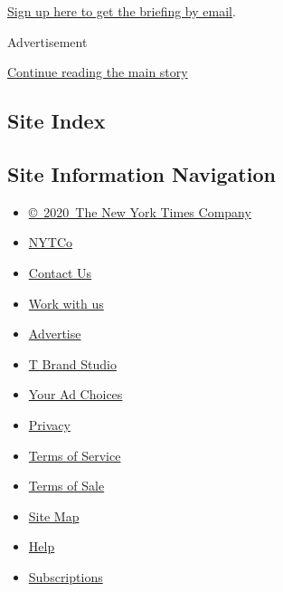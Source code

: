 \href{https://www.nytimes.com/newsletters/coronavirus-briefing}{Sign up
here to get the briefing by email}.

Advertisement

\protect\hyperlink{after-bottom}{Continue reading the main story}

\hypertarget{site-index}{%
\subsection{Site Index}\label{site-index}}

\hypertarget{site-information-navigation}{%
\subsection{Site Information
Navigation}\label{site-information-navigation}}

\begin{itemize}
\tightlist
\item
  \href{https://help.nytimes.com/hc/en-us/articles/115014792127-Copyright-notice}{©~2020~The
  New York Times Company}
\end{itemize}

\begin{itemize}
\tightlist
\item
  \href{https://www.nytco.com/}{NYTCo}
\item
  \href{https://help.nytimes.com/hc/en-us/articles/115015385887-Contact-Us}{Contact
  Us}
\item
  \href{https://www.nytco.com/careers/}{Work with us}
\item
  \href{https://nytmediakit.com/}{Advertise}
\item
  \href{http://www.tbrandstudio.com/}{T Brand Studio}
\item
  \href{https://www.nytimes.com/privacy/cookie-policy\#how-do-i-manage-trackers}{Your
  Ad Choices}
\item
  \href{https://www.nytimes.com/privacy}{Privacy}
\item
  \href{https://help.nytimes.com/hc/en-us/articles/115014893428-Terms-of-service}{Terms
  of Service}
\item
  \href{https://help.nytimes.com/hc/en-us/articles/115014893968-Terms-of-sale}{Terms
  of Sale}
\item
  \href{https://spiderbites.nytimes.com}{Site Map}
\item
  \href{https://help.nytimes.com/hc/en-us}{Help}
\item
  \href{https://www.nytimes.com/subscription?campaignId=37WXW}{Subscriptions}
\end{itemize}

